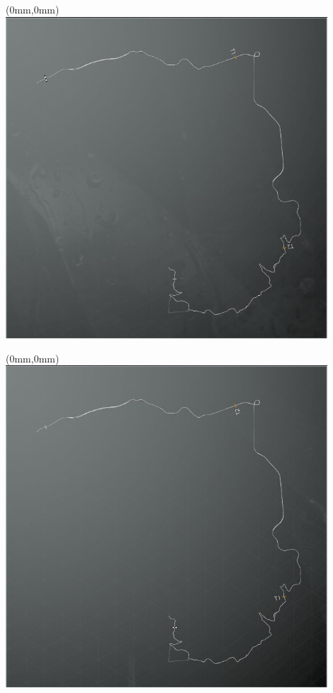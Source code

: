 \null\newpage
\begin{textblock*}{30mm}(0mm,0mm)%
\includegraphics[width=120mm]{TR/2015-05-20_00017.png}
\end{textblock*}
\null\newpage
\begin{textblock*}{30mm}(0mm,0mm)%
\includegraphics[width=120mm]{TR/2015-05-20_00013.png}
\end{textblock*}
